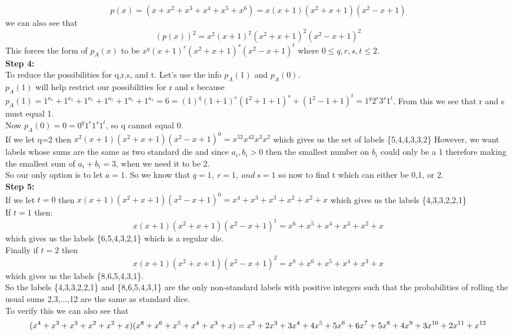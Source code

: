 \documentclass[10pt,a4paper]{report}
\begin{document}
	\[p(x) = (x + x^2 + x^3 + x^4 + x^5 + x^6) = x(x+1)(x^2 + x + 1)(x^2 - x + 1) \]
	we can also see that\\
	\[(p(x))^2 = x^2(x+1)^2(x^2 + x + 1)^2(x^2 - x + 1)^2 \]
	This forces the form of $p_A(x)$ to be $x^q(x+1)^r(x^2+x+1)^s(x^2-x+1)^t$ where $0\leq q,r,s,t\leq2$.\\
	\newline
	\textbf{Step 4:}\\
	To reduce the possibilities for q,r,s, and t. Let's use the info $p_A(1)$ and $p_A(0)$.\\
	$p_A(1)$ will help restrict our possibilities for r and s because $p_A(1) = 1^{a_1} + 1^{a_1} + 1^{a_1} + 1^{a_1} + 1^{a_1} + 1^{a_1} = 6 = (1)^q(1+1)^r(1^2+1+1)^s+(1^2 - 1 + 1)^t = 1^q2^r3^s1^t$.  From this we see that r and s must equal 1.\\
	\newline
	Now $p_A(0) = 0 = 0^q1^r1^s1^t$, so q cannot equal 0.\\
	If we let q=2 then $x^2(x+1)(x^2+x+1)(x^2-x+1)^0 = x^52x^42x^3x^2$ which gives us the set of labels \{5,4,4,3,3,2\} However, we want labels whose sums are the same as two standard die and since $a_i,b_i > 0$ then the smallest number on $b_i$ could only be a 1 therefore making the smallest sum of $a_i+b_i = 3$, when we need it to be 2.\\
	So our only option is to let $a=1$. So we know that $q=1,\ r=1,\ and\ s=1$ so now to find t which can either be 0,1, or 2.\\
	\newline
	\textbf{Step 5:}\\
	If we let $t=0$ then $x(x+1)(x^2+x+1)(x^2-x+1)^0 = x^4 + x^3 + x^3 + x^2 + x^2 + x$ which gives us the labels \{4,3,3,2,2,1\}\\
	\newline
	If $t = 1$ then:\\
	\[x(x+1)(x^2+x+1)(x^2-x+1)^1 = x^6 + x^5 + x^4 + x^3 + x^2 + x\]
	which gives us the labels \{6,5,4,3,2,1\} which is a regular die.\\
	Finally if $t=2$ then
	\[x(x+1)(x^2+x+1)(x^2-x+1)^2 = x^8 + x^6 + x^5 + x^4 + x^3 + x \]
	which gives us the labels \{8,6,5,4,3,1\}.\\
	\newline
	So the labels \{4,3,3,2,2,1\} and \{8,6,5,4,3,1\} are the only non-standard labels with positive integers such that the probabilities of rolling the usual sums 2,3,...,12 are the same as standard dice.\\
	To verify this we can also see that
	\[(x^4 + x^3 + x^3 + x^2 + x^2 + x)(x^8 + x^6 + x^5 + x^4 + x^3 + x)\\= x^2 + 2x^3 + 3x^4 + 4x^5 + 5x^6 + 6x^7 + 5x^8 + 4x^9 + 3x^{10} + 2x^{11} + x^{12} \]
	
\end{document}
